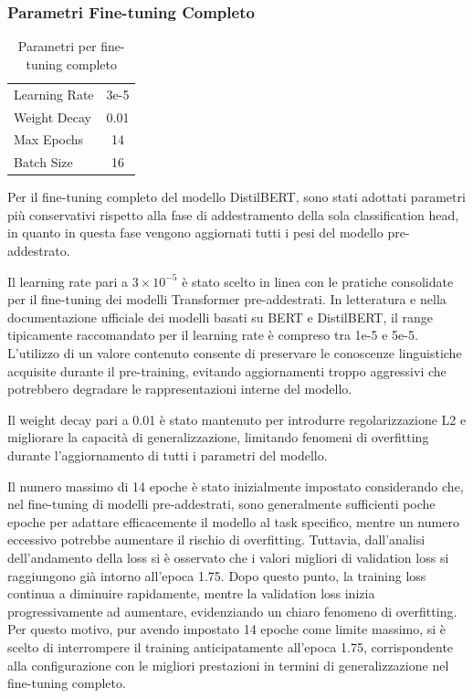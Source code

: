 \documentclass[a4paper,12pt]{article}
\begin{document}
\subsubsection{Parametri Fine-tuning Completo}

\begin{table}[H]
    \centering
    \begin{tabular}{lc}
        \toprule
        Learning Rate & 3e-5 \\
        Weight Decay  & 0.01 \\
        Max Epochs    & 14   \\
        Batch Size    & 16   \\
        \bottomrule
    \end{tabular}
    \caption{Parametri per fine-tuning completo}
\end{table}

Per il fine-tuning completo del modello DistilBERT, sono stati adottati parametri più conservativi rispetto alla fase di addestramento della sola classification head, in quanto in questa fase vengono aggiornati tutti i pesi del modello pre-addestrato.

Il learning rate pari a $3 \times 10^{-5}$ è stato scelto in linea con le pratiche consolidate per il fine-tuning dei modelli Transformer pre-addestrati. In letteratura e nella documentazione ufficiale dei modelli basati su BERT e DistilBERT, il range tipicamente raccomandato per il learning rate è compreso tra 1e-5 e 5e-5. L’utilizzo di un valore contenuto consente di preservare le conoscenze linguistiche acquisite durante il pre-training, evitando aggiornamenti troppo aggressivi che potrebbero degradare le rappresentazioni interne del modello.

Il weight decay pari a 0.01 è stato mantenuto per introdurre regolarizzazione L2 e migliorare la capacità di generalizzazione, limitando fenomeni di overfitting durante l’aggiornamento di tutti i parametri del modello.

Il numero massimo di 14 epoche è stato inizialmente impostato considerando che, nel fine-tuning di modelli pre-addestrati, sono generalmente sufficienti poche epoche per adattare efficacemente il modello al task specifico, mentre un numero eccessivo potrebbe aumentare il rischio di overfitting. Tuttavia, dall’analisi dell’andamento della loss si è osservato che i valori migliori di validation loss si raggiungono già intorno all’epoca 1.75. Dopo questo punto, la training loss continua a diminuire rapidamente, mentre la validation loss inizia progressivamente ad aumentare, evidenziando un chiaro fenomeno di overfitting. Per questo motivo, pur avendo impostato 14 epoche come limite massimo, si è scelto di interrompere il training anticipatamente all’epoca 1.75, corrispondente alla configurazione con le migliori prestazioni in termini di generalizzazione nel fine-tuning completo.
\end{document}
